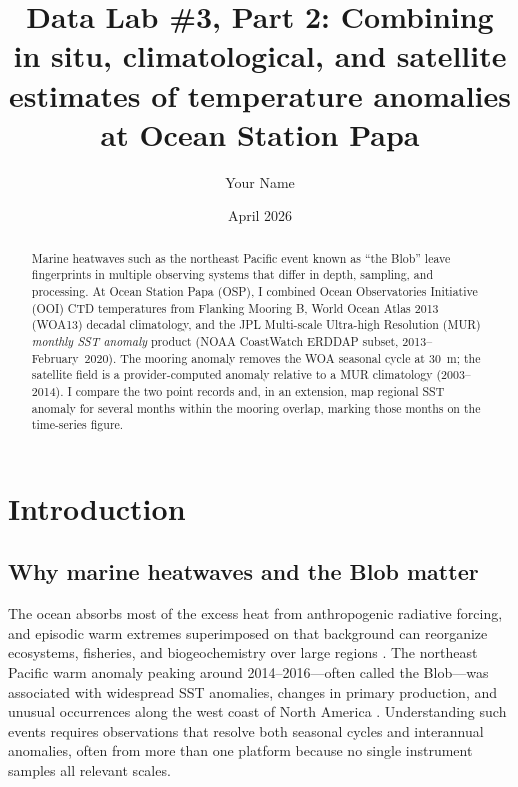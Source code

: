 \documentclass[11pt,letterpaper]{article}
\title{Data Lab \#3, Part 2: Combining in situ, climatological, and satellite estimates of temperature anomalies at Ocean Station Papa}
\author{Your Name}
\date{April 2026}
\begin{document}
\maketitle

\begin{abstract}
Marine heatwaves such as the northeast Pacific event known as ``the Blob'' leave fingerprints in multiple observing systems that differ in depth, sampling, and processing. At Ocean Station Papa (OSP), I combined Ocean Observatories Initiative (OOI) CTD temperatures from Flanking Mooring B, World Ocean Atlas 2013 (WOA13) decadal climatology, and the JPL Multi-scale Ultra-high Resolution (MUR) \emph{monthly SST anomaly} product (NOAA CoastWatch ERDDAP subset, 2013--February~2020). The mooring anomaly removes the WOA seasonal cycle at \SI{30}{\meter}; the satellite field is a provider-computed anomaly relative to a MUR climatology (2003--2014). I compare the two point records and, in an extension, map regional SST anomaly for several months within the mooring overlap, marking those months on the time-series figure.
\end{abstract}

\section{Introduction}

\subsection*{Why marine heatwaves and the Blob matter}
The ocean absorbs most of the excess heat from anthropogenic radiative forcing, and episodic warm extremes superimposed on that background can reorganize ecosystems, fisheries, and biogeochemistry over large regions \cite{bond2015,hobday2016}. The northeast Pacific warm anomaly peaking around 2014--2016---often called the Blob---was associated with widespread SST anomalies, changes in primary production, and unusual occurrences along the west coast of North America \cite{bond2015}. Understanding such events requires observations that resolve both seasonal cycles and interannual anomalies, often from more than one platform because no single instrument samples all relevant scales.
\end{document}
